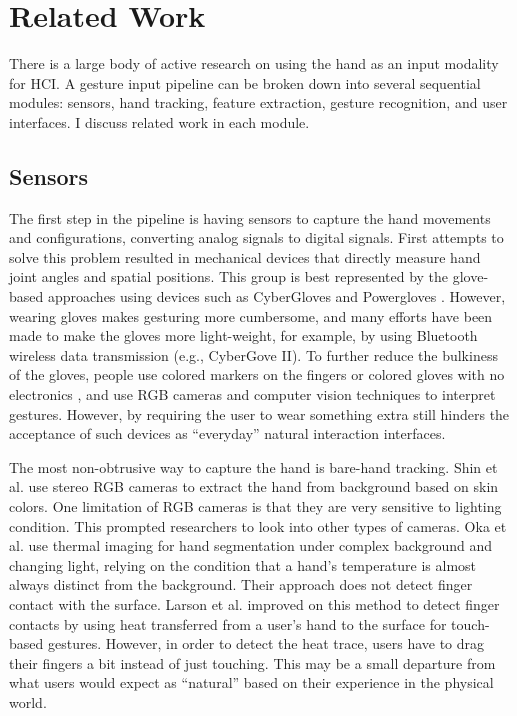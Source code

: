 \chapter{Related Work}\label{chap:related}
There is a large body of active research on using the hand as an input modality
for HCI.  A gesture input
pipeline can be broken down into several sequential modules: sensors, hand
tracking, feature extraction, gesture recognition, and user interfaces.
I discuss related work in each module.

\section{Sensors}
The first step in the pipeline is having sensors to capture the hand movements
and configurations, converting analog signals to digital signals. First attempts
to solve this problem resulted in mechanical devices that directly measure hand
joint angles and spatial positions. This group is best represented by the
glove-based approaches using devices such as CyberGloves \cite{fels09} and
Powergloves \cite{kadous02}. However, wearing gloves makes gesturing more
cumbersome, and many efforts have been made to make the gloves more
light-weight, for example, by using Bluetooth wireless data transmission (e.g.,
CyberGove II). To further reduce the bulkiness of the gloves, people use colored
markers on the fingers \cite{mistry09} or colored gloves with no electronics \cite{Wang09}, and use RGB
cameras and computer vision techniques to interpret gestures. However, by
requiring the user to wear something extra still hinders the acceptance of
such devices as ``everyday'' natural interaction interfaces. 

The most non-obtrusive way to capture the hand is bare-hand tracking. Shin et
al. \cite{shin04} use stereo RGB cameras to extract the hand from background
based on skin colors. One limitation of RGB cameras is that they are very
sensitive to lighting condition. This prompted researchers to look into other types of cameras. Oka et al. 
\cite{Oka02} use thermal imaging for hand segmentation under complex
background and changing light, relying on the condition that a hand's
temperature is almost always distinct from the background. Their approach does
not detect finger contact with the surface. Larson et al. \cite{larson11}
improved on this method to detect finger contacts by using
heat transferred from a user's hand to the surface for touch-based gestures.
However, in order to detect the heat trace, users have to drag their fingers a
bit instead of just touching. This may be a small departure from what users
would expect as ``natural'' based on their experience in the physical world.


